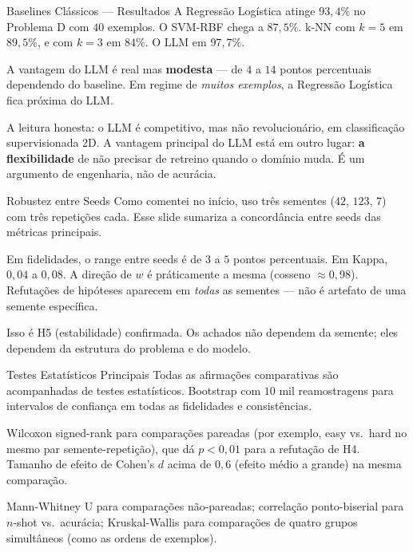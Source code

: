\documentclass[aspectratio=169,10pt]{beamer}
\begin{document}
\begin{frame}{Baselines Cl\'assicos --- Resultados}
  \small
  A Regress\~ao Log\'istica atinge $93{,}4\%$ no Problema D com $40$ exemplos. O SVM-RBF chega a $87{,}5\%$.
  k-NN com $k=5$ em $89{,}5\%$, e com $k=3$ em $84\%$. O LLM em $97{,}7\%$.
  \medskip

  A vantagem do LLM \'e real mas \textbf{modesta} --- de $4$ a $14$ pontos percentuais dependendo do
  baseline. Em regime de \emph{muitos exemplos}, a Regress\~ao Log\'istica fica pr\'oxima do LLM.
  \medskip

  A leitura honesta: o LLM \'e competitivo, mas n\~ao revolucion\'ario, em classifica\c{c}\~ao
  supervisionada 2D. A vantagem principal do LLM est\'a em outro lugar: \textbf{a flexibilidade} de
  n\~ao precisar de retreino quando o dom\'inio muda. \'E um argumento de engenharia, n\~ao de acur\'acia.
\end{frame}

\begin{frame}{Robustez entre Seeds}
  \small
  Como comentei no in\'icio, uso tr\^es sementes ($42$, $123$, $7$) com tr\^es repeti\c{c}\~oes cada. Esse
  slide sumariza a concord\^ancia entre seeds das m\'etricas principais.
  \medskip

  Em fidelidades, o range entre seeds \'e de $3$ a $5$ pontos percentuais. Em Kappa, $0{,}04$ a $0{,}08$.
  A dire\c{c}\~ao de $w$ \'e pr\'aticamente a mesma (cosseno $\approx 0{,}98$). Refuta\c{c}\~oes de
  hip\'oteses aparecem em \emph{todas} as sementes --- n\~ao \'e artefato de uma semente espec\'ifica.
  \medskip

  Isso \'e H5 (estabilidade) confirmada. Os achados n\~ao dependem da semente; eles dependem da
  estrutura do problema e do modelo.
\end{frame}

\begin{frame}{Testes Estat\'isticos Principais}
  \small
  Todas as afirma\c{c}\~oes comparativas s\~ao acompanhadas de testes estat\'isticos. Bootstrap com $10$
  mil reamostragens para intervalos de confian\c{c}a em todas as fidelidades e consist\^encias.
  \medskip

  Wilcoxon signed-rank para compara\c{c}\~oes pareadas (por exemplo, easy vs.\ hard no mesmo par
  semente-repeti\c{c}\~ao), que d\'a $p < 0{,}01$ para a refuta\c{c}\~ao de H4. Tamanho de efeito
  de Cohen's $d$ acima de $0{,}6$ (efeito m\'edio a grande) na mesma compara\c{c}\~ao.
  \medskip

  Mann-Whitney U para compara\c{c}\~oes n\~ao-pareadas; correla\c{c}\~ao ponto-biserial para
  $n$-shot vs.\ acur\'acia; Kruskal-Wallis para compara\c{c}\~oes de quatro grupos simult\^aneos (como as
  ordens de exemplos).
\end{frame}
\end{document}
